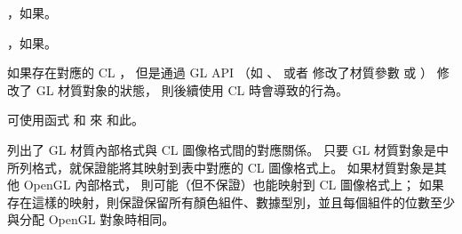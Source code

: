 \item {}，如果\scdevfailres。

\item {}，如果\schostfailres。
\stopigBase

如果存在對應的 CL ，
但是通過 GL API （如 、  或者
修改了材質參數  或 ）
修改了 GL 材質對象的狀態，
則後續使用 CL 時會導致的行為。

可使用函式  和  來
和此。

列出了 GL 材質內部格式與 CL 圖像格式間的對應關係。
只要 GL 材質對象是中所列格式，就保證能將其映射到表中對應的 CL 圖像格式上。
如果材質對象是其他 OpenGL 內部格式，
則可能（但不保證）也能映射到 CL 圖像格式上；
如果存在這樣的映射，則保證保留所有顏色組件、數據型別，並且每個組件的位數至少與分配 OpenGL 對象時相同。

{}

